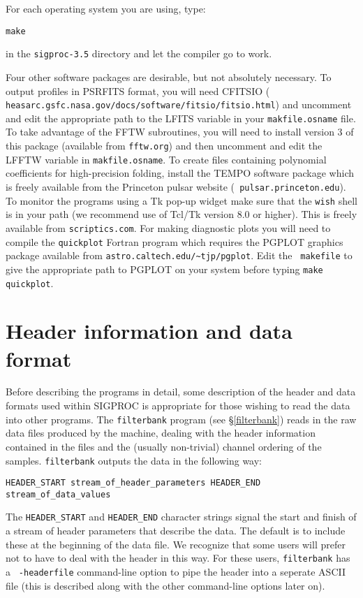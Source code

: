 \documentclass[11pt]{article}
\begin{document}
For each operating system you are using, type:

\noindent
{\tt make}

\noindent in the
{\tt sigproc-3.5} directory
and let the compiler go to work. 

Four other software packages are desirable, but not absolutely
necessary.  To output profiles in PSRFITS format, you will need
CFITSIO ({\tt 
heasarc.gsfc.nasa.gov/docs/software/fitsio/fitsio.html})
and uncomment and edit the appropriate path to the LFITS variable in your
{\tt makfile.osname} file. To take advantage of the FFTW subroutines,
you will need to install version 3 of this package (available from
{\tt fftw.org}) and then uncomment and edit the LFFTW variable in
{\tt makfile.osname}.
To create files containing polynomial coefficients for
high-precision folding, install the {\sc TEMPO} software package which
is freely available from the Princeton pulsar website ({\tt
pulsar.princeton.edu}).  To monitor the programs using a Tk
pop-up widget make sure that the {\tt wish} shell is in your path (we
recommend use of Tcl/Tk version 8.0 or higher). This is freely
available from {\tt scriptics.com}. For making diagnostic
plots you will need to compile the {\tt quickplot} Fortran program which
requires the {\sc PGPLOT} graphics package available from 
\verb+astro.caltech.edu/~tjp/pgplot+. Edit the {\tt
makefile} to give the appropriate path to {\sc PGPLOT} on your system
before typing {\tt make quickplot}.

\clearpage
\section{Header information and data format}
\label{dataformat}
Before describing the programs in detail, some description of the
header and data formats used within SIGPROC is appropriate for those
wishing to read the data into other programs.  The {\tt filterbank}
program (see \S \ref{filterbank}) reads in the raw data files produced
by the machine, dealing with the header information contained in the
files and the (usually non-trivial) channel ordering of the
samples. {\tt filterbank} outputs the data in the following way:
\begin{verbatim}
HEADER_START stream_of_header_parameters HEADER_END stream_of_data_values
\end{verbatim}
The \verb+HEADER_START+ and \verb+HEADER_END+ character strings
signal the start and
finish of a stream of header parameters that describe the data.  The
default is to include these at the beginning of the data file.  We
recognize that some users will prefer not to have to deal with the
header in this way. For these users, {\tt filterbank} has a {\tt
-headerfile} command-line option to pipe the header into a seperate
ASCII file (this is described along with the other command-line
options later on).
\end{document}
